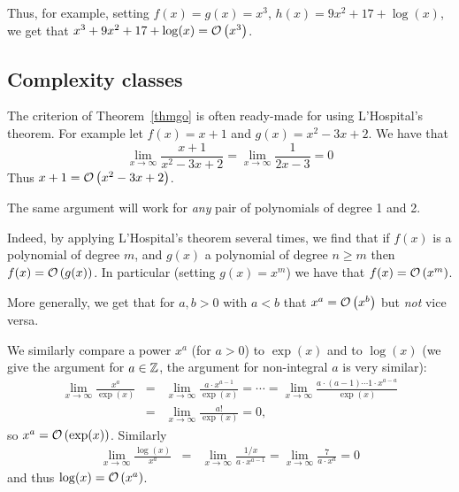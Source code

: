 Thus, for example, setting $f(x)=g(x)=x^3$, $h(x)=9x^2+17+\log(x)$,
we get that $x^3+9x^2+17+\log(x)={\mathcal O}\/\left(x^3\right)$.

\subsection{Complexity classes}
The criterion of Theorem~\ref{thmgo} is often ready-made for using
L'Hospital's theorem. For example let $f(x)=x+1$ and $g(x)=x^2-3x+2$.
We have that
\[
\lim_{x\to\infty}\frac{x+1}{x^2-3x+2}
=\lim_{x\to\infty}\frac{1}{2x-3}=0
\]
Thus $x+1={\mathcal O}\/\left(x^2-3x+2\right)$.

The same argument will work for {\em any} pair of polynomials of degree 1
and 2.
\smallskip

Indeed, by applying L'Hospital's theorem several times, we find that if
$f(x)$ is a polynomial of degree $m$, and $g(x)$ a polynomial of degree
$n\ge m$ then $f(x)={\mathcal O}\/\left(g(x)\right)$. In particular (setting $g(x)=x^m$) we have
that $f(x)={\mathcal O}\/\left(x^m\right)$.

More generally, we get that for $a,b>0$ with $a<b$ that $x^a={\mathcal O}\/\left(x^b\right)$ but
{\em not} vice versa.
\smallskip

We similarly compare a power $x^a$ (for $a>0$) to $\exp(x)$ and to $\log(x)$
(we give the argument for $a\in{\mathbb Z}$, the argument for non-integral $a$ is very
similar):
\begin{eqnarray*}
\lim_{x\to\infty}\frac{x^a}{\exp(x)}&=&
\lim_{x\to\infty} \frac{a\cdot x^{a-1}}{\exp(x)}=\cdots=
\lim_{x\to\infty} \frac{a\cdot(a-1)\cdots 1\cdot x^{a-a}}{\exp(x)}\\
&=&
\lim_{x\to\infty} \frac{a!}{\exp(x)}=0,
\end{eqnarray*}
so $x^a={\mathcal O}\/\left(\exp(x)\right)$. Similarly
\begin{eqnarray*}
\lim_{x\to\infty}\frac{\log(x)}{x^a}&=&
\lim_{x\to\infty}\frac{1/x}{a\cdot x^{a-1}}=
\lim_{x\to\infty}\frac{7}{a\cdot x^a}=0
\end{eqnarray*}
and thus $\log(x)={\mathcal O}\/\left(x^a\right)$.

